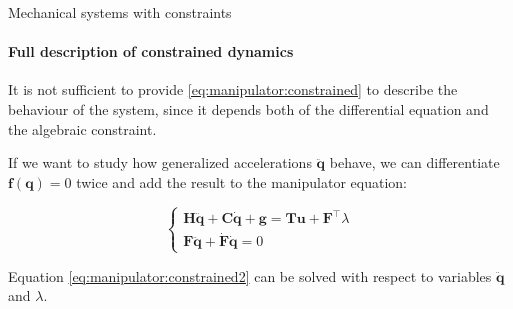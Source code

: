 \documentclass{beamer}
\begin{document}
\begin{frame}{Mechanical systems with constraints}
\framesubtitle{Full description of constrained dynamics}
\begin{flushleft}

It is not sufficient to provide \eqref{eq:manipulator:constrained} to describe the behaviour of the system, since it depends both of the differential equation and the algebraic constraint.

\bigskip

If we want to study how generalized accelerations $\ddot{\mathbf{q}}$ behave, we can differentiate $\mathbf{f}(\mathbf{q}) = 0$ twice and add the result to the manipulator equation:
 
\begin{equation}
\begin{cases}
\label{eq:manipulator:constrained2}
    \mathbf{H}\ddot{\mathbf{q}} + \mathbf{C}\dot{\mathbf{q}} + \mathbf{g} = \mathbf{T}\mathbf{u} + \mathbf{F}^\top \lambda \\
    \mathbf{F}\ddot{\mathbf{q}} + \dot{\mathbf{F}}\dot{\mathbf{q}} = 0
\end{cases}
\end{equation}

Equation \eqref{eq:manipulator:constrained2} can be solved with respect to variables $\ddot{\mathbf{q}}$ and $\lambda$.

\end{flushleft}
\end{frame}
\end{document}
